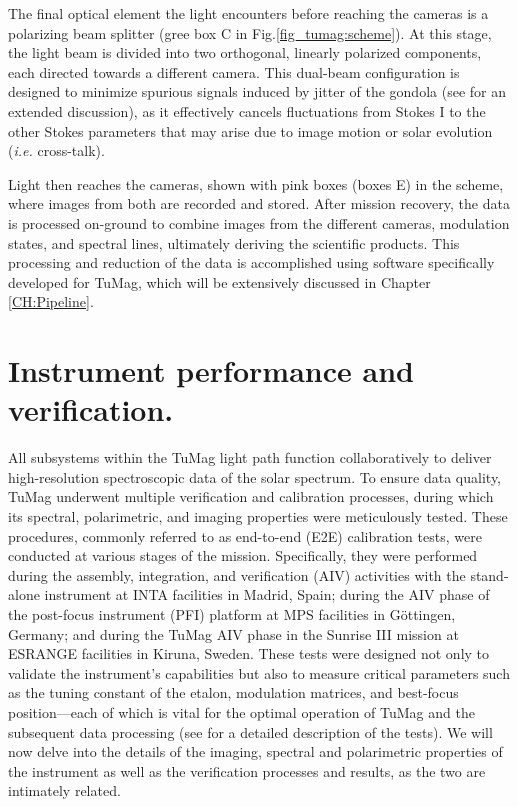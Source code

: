 The final optical element the light encounters before reaching the cameras is a polarizing beam splitter (gree box C in Fig.\ref{fig_tumag:scheme}). At this stage, the light beam is divided into two orthogonal, linearly polarized components, each directed towards a different camera. This dual-beam configuration \citep{lites-doublebeam} is designed to minimize spurious signals induced by jitter of the gondola (see \cite{libro_JoseCarlos} for an extended discussion), as it effectively cancels fluctuations from Stokes I to the other Stokes parameters that may arise due to image motion or solar evolution (\textit{i.e.} cross-talk).

Light then reaches the cameras, shown with pink boxes (boxes E) in the scheme, where images from both are recorded and stored. After mission recovery, the data is processed on-ground to combine images from the different cameras, modulation states, and spectral lines, ultimately deriving the scientific products. This processing and reduction of the data is accomplished using software specifically developed for TuMag, which will be extensively discussed in Chapter \ref{CH:Pipeline}. 

\section{Instrument performance and verification.}

All subsystems within the TuMag light path function collaboratively to deliver high-resolution spectroscopic data of the solar spectrum. To ensure data quality, TuMag underwent multiple verification and calibration processes, during which its spectral, polarimetric, and imaging properties were meticulously tested. These procedures, commonly referred to as end-to-end (E2E) calibration tests, were conducted at various stages of the mission. Specifically, they were performed during the assembly, integration, and verification (AIV) activities with the stand-alone instrument at INTA facilities in Madrid, Spain; during the AIV phase of the post-focus instrument (PFI) platform at MPS facilities in Göttingen, Germany; and during the TuMag AIV phase in the Sunrise III mission at ESRANGE facilities in Kiruna, Sweden. These tests were designed not only to validate the instrument's capabilities but also to measure critical parameters such as the tuning constant of the etalon, modulation matrices, and best-focus position—each of which is vital for the optimal operation of TuMag and the subsequent data processing (see \cite{e2e-tests-inta} for a detailed description of the tests). We will now delve into the details of the imaging, spectral and polarimetric properties of the instrument as well as the verification processes and results, as the two are intimately related.  


